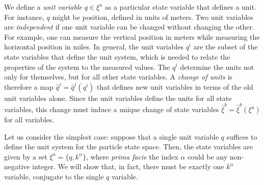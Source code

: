 \documentclass[letterpaper]{article}
\begin{document}
We define a \textit{unit variable} $q \in \xi^a$ as a particular state variable that defines a unit. For instance, $q$ might be position, defined in units of meters. Two unit variables are \textit{independent} if one unit variable can be changed without changing the other. For example, one can measure the vertical position in meters while measuring the horizontal position in miles.  In general, the unit variables $q^i$ are the subset of the state variables that define the unit system, which is needed to relate the properties of the system to the measured values. The $q^i$ determine the units not only for themselves, but for all other state variables. A \textit{change of units} is therefore a map $\hat{q}^j = \hat{q}^j(q^i)$ that defines new unit variables in terms of the old unit variables alone. Since the unit variables define the units for all state variables, this change must induce a unique change of state variables $\hat{\xi}^b = \hat{\xi}^b(\xi^a)$ for all variables.



Let us consider the simplest case: suppose that a single unit variable $q $ suffices to define the unit system for the particle state space. Then, the state variables are given by a set $\xi^a = \{ q, k^\alpha \}$, where \textit{prima facie} the index $\alpha$ could be any non-negative integer. We will show that, in fact, there must be exactly one $k^\alpha$ variable, conjugate to the single $q$ variable. 
\end{document}

